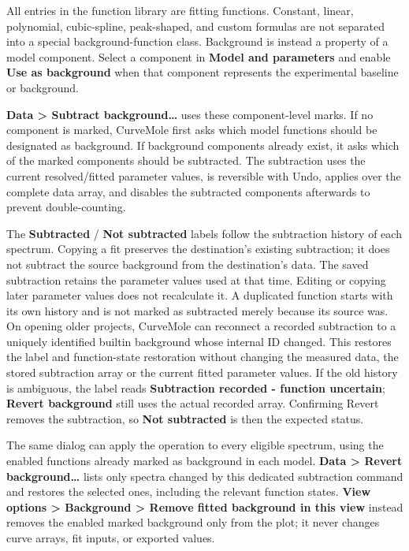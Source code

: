 \documentclass[
  10pt,
  a4paper,
  oneside]{scrreprt}
\begin{document}
All entries in the function library are fitting functions. Constant,
linear, polynomial, cubic-spline, peak-shaped, and custom formulas are
not separated into a special background-function class. Background is
instead a property of a model component. Select a component in
\textbf{Model and parameters} and enable \textbf{Use as background} when
that component represents the experimental baseline or background.

\textbf{Data \textgreater{} Subtract background\ldots{}} uses these
component-level marks. If no component is marked, CurveMole first asks
which model functions should be designated as background. If background
components already exist, it asks which of the marked components should
be subtracted. The subtraction uses the current resolved/fitted
parameter values, is reversible with Undo, applies over the complete
data array, and disables the subtracted components afterwards to prevent
double-counting.

The \textbf{Subtracted} / \textbf{Not subtracted} labels follow the
subtraction history of each spectrum. Copying a fit preserves the
destination's existing subtraction; it does not subtract the source
background from the destination's data. The saved subtraction retains
the parameter values used at that time. Editing or copying later
parameter values does not recalculate it. A duplicated function starts
with its own history and is not marked as subtracted merely because its
source was. On opening older projects, CurveMole can reconnect a
recorded subtraction to a uniquely identified builtin background whose
internal ID changed. This restores the label and function-state
restoration without changing the measured data, the stored subtraction
array or the current fitted parameter values. If the old history is
ambiguous, the label reads \textbf{Subtraction recorded - function
uncertain}; \textbf{Revert background} still uses the actual recorded
array. Confirming Revert removes the subtraction, so \textbf{Not
subtracted} is then the expected status.

The same dialog can apply the operation to every eligible spectrum,
using the enabled functions already marked as background in each model.
\textbf{Data \textgreater{} Revert background\ldots{}} lists only
spectra changed by this dedicated subtraction command and restores the
selected ones, including the relevant function states. \textbf{View
options \textgreater{} Background \textgreater{} Remove fitted
background in this view} instead removes the enabled marked background
only from the plot; it never changes curve arrays, fit inputs, or
exported values.
\end{document}
